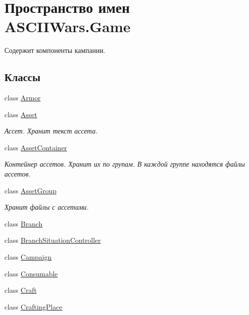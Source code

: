 \hypertarget{namespace_a_s_c_i_i_wars_1_1_game}{}\section{Пространство имен A\+S\+C\+I\+I\+Wars.\+Game}
\label{namespace_a_s_c_i_i_wars_1_1_game}


Содержит компоненты кампании.  


\subsection*{Классы}
\begin{DoxyCompactItemize}
\item 
class \hyperlink{class_a_s_c_i_i_wars_1_1_game_1_1_armor}{Armor}
\item 
class \hyperlink{class_a_s_c_i_i_wars_1_1_game_1_1_asset}{Asset}
\begin{DoxyCompactList}\small\item\em Ассет. Хранит текст ассета. \end{DoxyCompactList}\item 
class \hyperlink{class_a_s_c_i_i_wars_1_1_game_1_1_asset_container}{Asset\+Container}
\begin{DoxyCompactList}\small\item\em Контейнер ассетов. Хранит их по групам. В каждой группе находятся файлы ассетов. \end{DoxyCompactList}\item 
class \hyperlink{class_a_s_c_i_i_wars_1_1_game_1_1_asset_group}{Asset\+Group}
\begin{DoxyCompactList}\small\item\em Хранит файлы с ассетами. \end{DoxyCompactList}\item 
class \hyperlink{class_a_s_c_i_i_wars_1_1_game_1_1_branch}{Branch}
\item 
class \hyperlink{class_a_s_c_i_i_wars_1_1_game_1_1_branch_situation_controller}{Branch\+Situation\+Controller}
\item 
class \hyperlink{class_a_s_c_i_i_wars_1_1_game_1_1_campaign}{Campaign}
\item 
class \hyperlink{class_a_s_c_i_i_wars_1_1_game_1_1_consumable}{Consumable}
\item 
class \hyperlink{class_a_s_c_i_i_wars_1_1_game_1_1_craft}{Craft}
\item 
class \hyperlink{class_a_s_c_i_i_wars_1_1_game_1_1_crafting_place}{Crafting\+Place}

\end{DoxyCompactItemize}
